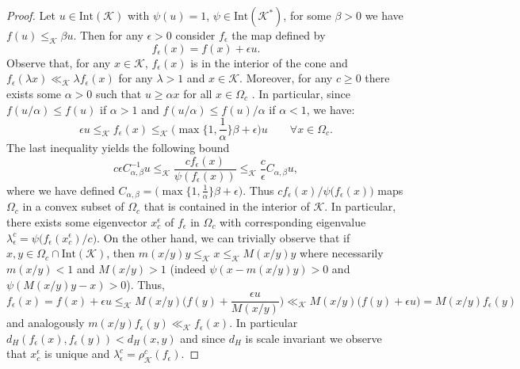 \documentclass{article}
\newcommand{\cradius}{\rho_{\cone}}
\newcommand{\cone}{\mathcal{K}}
\newcommand{\interior}{\mathrm{Int}}
\newcommand{\dist}{d_H}
\newcommand{\cleq}{\leq_{\cone}}
\newcommand{\cll}{\ll_{\cone}}
\begin{document}
\begin{proof}
%
Let $u\in \interior(\cone)$ with $\psi(u)=1$, $\psi\in\interior(\cone^*)$, for some $\beta>0$ we have $f(u)\cleq \beta u$. Then for any $\epsilon>0$ consider $f_{\epsilon}$ the map defined by
\begin{equation}
 f_{\epsilon}(x)=f(x)+\epsilon u.   
\end{equation}
%
Observe that, for any $x\in \cone$, $f_{\epsilon}(x)$ is in the interior of the cone and $f_\epsilon(\lambda x)\cll \lambda f_\epsilon(x)$ for any $\lambda>1$ and $x\in \cone$.
%
Moreover, for any $c\geq 0$ there exists some $\alpha>0$ such that $u\geq \alpha x$ for all $x\in \Omega_c$ . In particular, since $f(u/\alpha)\leq f(u)$ if $\alpha>1$ and $f(u/\alpha)\leq f(u)/\alpha$ if $\alpha<1$, we have: 
%
\begin{equation}
     \epsilon u \cleq f_{\epsilon}(x) \cleq \Big(\max\Big\{1,\frac{1}{\alpha}\Big\}\beta + \epsilon\Big) u \qquad \forall x\in \Omega_c.
\end{equation}
%
The last inequality yields the following bound
%
\begin{equation}
c \epsilon C_{\alpha,\beta}^{-1} u \cleq
\frac{c f_{\epsilon}(x)}{\psi(f_{\epsilon}(x))}\cleq \frac{c}{\epsilon} C_{\alpha,\beta} u ,
\end{equation}
where we have defined $C_{\alpha,\beta}=\Big(\max\Big\{1,\frac{1}{\alpha}\Big\}\beta + \epsilon\Big)$.
%
Thus $cf_{\epsilon}(x)/\psi\big(f_{\epsilon}(x)\big)$ maps $\Omega_c$ in a convex subset of $\Omega_c$ that is contained in the interior of $\cone$. In particular, there exists some eigenvector $x_c^{\epsilon}$ of $f_{\epsilon}$ in $\Omega_c$ with corresponding eigenvalue $\lambda^c_{\epsilon}=\psi\big(f_{\epsilon}(x_c^{\epsilon})/c\big)$. 
%
On the other hand, we can trivially observe that 
if $x,y\in \Omega_c\cap \interior(\cone)$, then $m(x/y) y\cleq x\cleq M(x/y) y$ where necessarily $m(x/y)<1$ and $M(x/y)>1$ (indeed $\psi(x-m(x/y) y)>0$ and $\psi(M(x/y) y-x)>0$). 
%
Thus, 
\begin{equation}
f_{\epsilon}(x)=f(x)+\epsilon u \cleq M(x/y)\Big( f(y)+\frac{\epsilon u}{M(x/y)} \Big)\cll M(x/y)\Big( f(y)+\epsilon  u\Big)=M(x/y)f_{\epsilon}(y)
\end{equation}
and analogously $m(x/y)f_{\epsilon}(y)\cll f_{\epsilon}(x)$. In particular $\dist(f_\epsilon(x),f_{\epsilon}(y))< d_{H}(x,y)$ and since $\dist$ is scale invariant we observe that $x_{c}^{\epsilon}$ is unique and $\lambda^c_{\epsilon}=\cradius^c(f_{\epsilon})$.
%






\end{proof}
\end{document}
